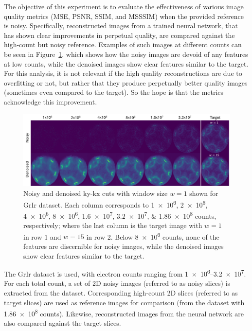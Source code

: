 The objective of this experiment is to evaluate the effectiveness of various image quality metrics (\gls{MSE}, \gls{PSNR}, \gls{SSIM}, and \gls{MSSSIM}) when the provided reference is noisy. Specifically, reconstructed images from a trained neural network, that has shown clear improvements in perpetual quality, are compared against the high-count but noisy reference. Examples of such images at different counts can be seen in Figure~\ref{fig:images-noisy-denoised}, which shows how the noisy images are devoid of any features at low counts, while the denoised images show clear features similar to the target. For this analysis, it is not relevant if the high quality reconstructions are due to overfitting or not, but rather that they produce perpetually better quality images (sometimes even compared to the target). So the hope is that the metrics acknowledge this improvement.

\begin{figure}[h]
    \centering
    \includegraphics[width=1\linewidth]{images/images_noisy_denoised_with_target.pdf}
    \caption{Noisy and denoised \gls{ky}-\gls{kx} cuts with window size $w=1$ shown for \gls{GrIr} dataset. Each column corresponds to \numlist{1e6;2e6;4e6;8e6;1.6e7;3.2e7;1.86e8} counts, respectively; where the last column is the target image with $w=1$ in row 1 and $w=15$ in row 2. Below \num{8e6} counts, none of the features are discernible for noisy images, while the denoised images show clear features similar to the target.}
    \label{fig:images-noisy-denoised}
\end{figure}

The \gls{GrIr} dataset is used, with electron counts ranging from \numrange{1e6}{3.2e7}. For each total count, a set of 2D noisy images (referred to as noisy slices) is extracted from the dataset. Corresponding high-count 2D slices (referred to as target slices) are used as reference images for comparison (from the dataset with \num{1.86e8} counts). Likewise, reconstructed images from the neural network are also compared against the target slices.

